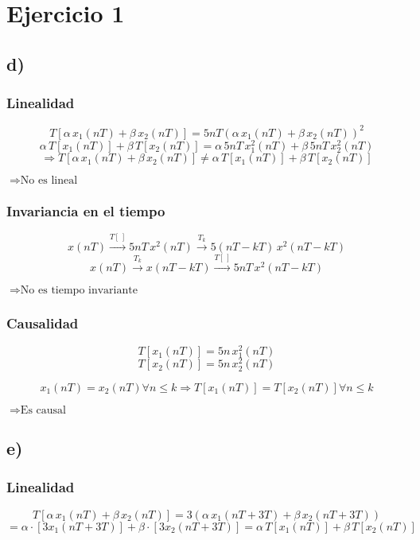 \documentclass[../../guia1.tex]{subfiles}
\begin{document}
\section*{Ejercicio 1}


\subsection*{d)}
\subsubsection*{Linealidad}
\[T[\alpha\, x_1(nT) + \beta\, x_2(nT)] = 5nT(\alpha\, x_1(nT) + \beta\, x_2(nT))^2\]
\[\alpha\, T[x_1(nT)] + \beta\, T[x_2(nT)] = \alpha \,5nT\,x_1^2(nT) + \beta\, 5nT\,x_2^2(nT)\]
\[\Rightarrow T[\alpha\, x_1(nT) + \beta\, x_2(nT)] \neq \alpha\, T[x_1(nT)] + \beta\, T[x_2(nT)]\]
\begin{center}
 $\Rightarrow \text{No es lineal}$
\end{center}
\subsubsection*{Invariancia en el tiempo}
\[x(nT) \xrightarrow{T[\,]} 5nT\,x^2(nT) \xrightarrow{T_k} 5(nT-kT)\,x^2(nT-kT)\]
\[x(nT) \xrightarrow{T_k} x(nT-kT) \xrightarrow{T[\,]} 5nT\, x^2(nT-kT)\]
\begin{center}
 $\Rightarrow \text{No es tiempo invariante}$
\end{center}
\subsubsection*{Causalidad}
\[T[x_1(nT)] = 5n\,x^2_1(nT)\]
\[T[x_2(nT)] = 5n\,x^2_2(nT)\]

\[x_1(nT)=x_2(nT) \forall n\leq k \Rightarrow T[x_1(nT)]=T[x_2(nT)] \forall n\leq k\]
\begin{center}
 $\Rightarrow \text{Es causal}$
\end{center}

\subsection*{e)}
\subsubsection*{Linealidad}
\[T[\alpha\, x_1(nT) + \beta\, x_2(nT)] = 3(\alpha\, x_1(nT+3T) + \beta\, x_2(nT+3T))\]
\[= \alpha \cdot [3x_1(nT+3T)] + \beta \cdot [3x_2(nT+3T)] = \alpha\, T[x_1(nT)] + \beta \, T[x_2(nT)]\]
\end{document}
